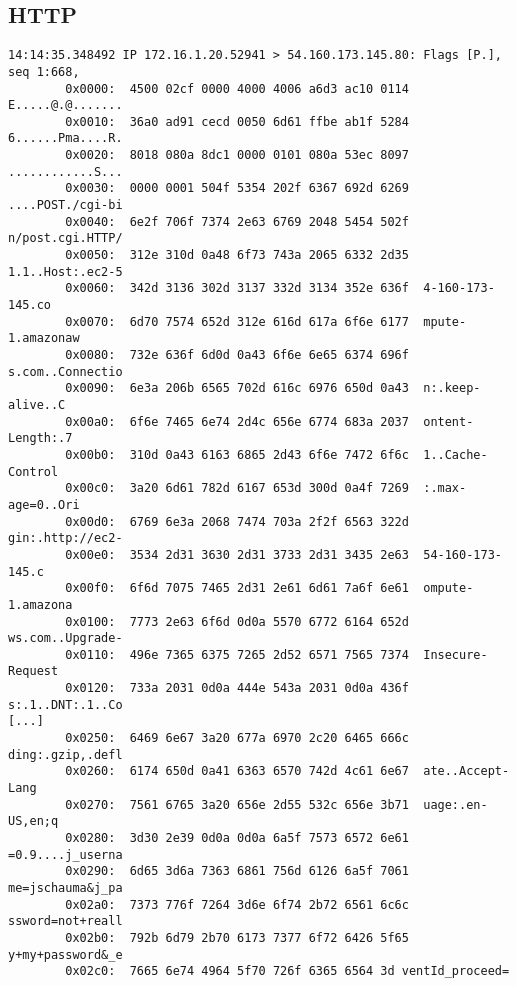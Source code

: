 \documentclass[xga]{xdvislides}
\begin{document}
\subsection{HTTP}
\small
\begin{verbatim}
14:14:35.348492 IP 172.16.1.20.52941 > 54.160.173.145.80: Flags [P.], seq 1:668,
        0x0000:  4500 02cf 0000 4000 4006 a6d3 ac10 0114  E.....@.@.......
        0x0010:  36a0 ad91 cecd 0050 6d61 ffbe ab1f 5284  6......Pma....R.
        0x0020:  8018 080a 8dc1 0000 0101 080a 53ec 8097  ............S...
        0x0030:  0000 0001 504f 5354 202f 6367 692d 6269  ....POST./cgi-bi
        0x0040:  6e2f 706f 7374 2e63 6769 2048 5454 502f  n/post.cgi.HTTP/
        0x0050:  312e 310d 0a48 6f73 743a 2065 6332 2d35  1.1..Host:.ec2-5
        0x0060:  342d 3136 302d 3137 332d 3134 352e 636f  4-160-173-145.co
        0x0070:  6d70 7574 652d 312e 616d 617a 6f6e 6177  mpute-1.amazonaw
        0x0080:  732e 636f 6d0d 0a43 6f6e 6e65 6374 696f  s.com..Connectio
        0x0090:  6e3a 206b 6565 702d 616c 6976 650d 0a43  n:.keep-alive..C
        0x00a0:  6f6e 7465 6e74 2d4c 656e 6774 683a 2037  ontent-Length:.7
        0x00b0:  310d 0a43 6163 6865 2d43 6f6e 7472 6f6c  1..Cache-Control
        0x00c0:  3a20 6d61 782d 6167 653d 300d 0a4f 7269  :.max-age=0..Ori
        0x00d0:  6769 6e3a 2068 7474 703a 2f2f 6563 322d  gin:.http://ec2-
        0x00e0:  3534 2d31 3630 2d31 3733 2d31 3435 2e63  54-160-173-145.c
        0x00f0:  6f6d 7075 7465 2d31 2e61 6d61 7a6f 6e61  ompute-1.amazona
        0x0100:  7773 2e63 6f6d 0d0a 5570 6772 6164 652d  ws.com..Upgrade-
        0x0110:  496e 7365 6375 7265 2d52 6571 7565 7374  Insecure-Request
        0x0120:  733a 2031 0d0a 444e 543a 2031 0d0a 436f  s:.1..DNT:.1..Co
[...]
        0x0250:  6469 6e67 3a20 677a 6970 2c20 6465 666c  ding:.gzip,.defl
        0x0260:  6174 650d 0a41 6363 6570 742d 4c61 6e67  ate..Accept-Lang
        0x0270:  7561 6765 3a20 656e 2d55 532c 656e 3b71  uage:.en-US,en;q
        0x0280:  3d30 2e39 0d0a 0d0a 6a5f 7573 6572 6e61  =0.9....j_userna
        0x0290:  6d65 3d6a 7363 6861 756d 6126 6a5f 7061  me=jschauma&j_pa
        0x02a0:  7373 776f 7264 3d6e 6f74 2b72 6561 6c6c  ssword=not+reall
        0x02b0:  792b 6d79 2b70 6173 7377 6f72 6426 5f65  y+my+password&_e
        0x02c0:  7665 6e74 4964 5f70 726f 6365 6564 3d ventId_proceed=

\end{verbatim}
\Normalsize
\end{document}
